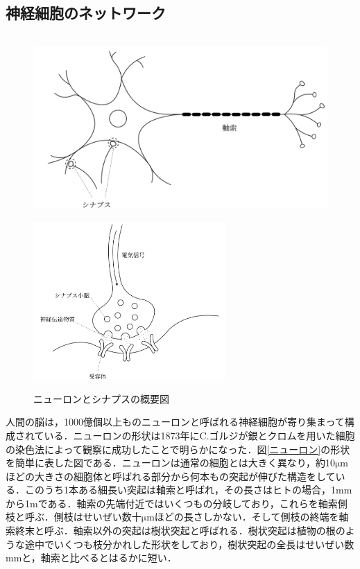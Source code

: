 \documentclass[a4paper,11pt]{jsreport}
\begin{document}
\subsection{神経細胞のネットワーク}
\begin{figure}[H]
  \begin{center}
    \includegraphics[height=7cm]{image/ニューロン.png}
    \label{ニューロン}
    \includegraphics[height=6cm]{image/シナプス.png}
    \label{シナプス}
  \end{center}
  \caption{ニューロンとシナプスの概要図}
\end{figure}
人間の脳は，1000億個以上ものニューロンと呼ばれる神経細胞が寄り集まって構成されている．ニューロンの形状は1873年にC.ゴルジが銀とクロムを用いた細胞の染色法によって観察に成功したことで明らかになった\cite{Gazzetta}．図\ref{ニューロン}の形状を簡単に表した図である．ニューロンは通常の細胞とは大きく異なり，約10$\mathrm{\mu}$mほどの大きさの細胞体と呼ばれる部分から何本もの突起が伸びた構造をしている．このうち1本ある細長い突起は軸索と呼ばれ，その長さはヒトの場合，1mmから1mである．軸索の先端付近ではいくつもの分岐しており，これらを軸索側枝と呼ぶ．側枝はせいぜい数十$\mathrm{\mu}$mほどの長さしかない．そして側枝の終端を軸索終末と呼ぶ．軸索以外の突起は樹状突起と呼ばれる．樹状突起は植物の根のような途中でいくつも枝分かれした形状をしており，樹状突起の全長はせいぜい数mmと，軸索と比べるとはるかに短い．\par
\end{document}
